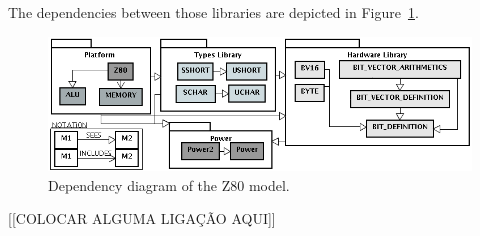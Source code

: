 \documentclass[a4paper]{llncs}
\begin{document}
The dependencies between those libraries are depicted in
Figure~\ref{fig:hardware-definition-graph}.

\begin{figure}[h]
\centering
\includegraphics[width=.87\textwidth]{diagramaEstrutural_vertical_ProB2.png}
 \caption{Dependency diagram of the Z80 model.}
\label{fig:hardware-definition-graph}
\end{figure}

[[COLOCAR ALGUMA LIGAÇÃO AQUI]]
%
%
%
%
\end{document}
